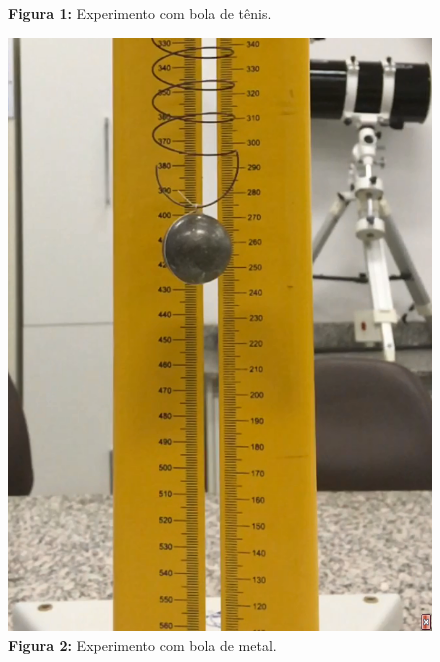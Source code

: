 \documentclass[a4paper, 12pt]{article}
\begin{document}
\begin{multicols}{2}
\begin{enumerate}
\begin{figure}[H]
				\captionsetup{labelformat=empty}
				\caption{\textbf{Figura 1:} Experimento com bola de tênis.}
			\end{figure}
			\begin{figure}[H]
				\centering
				\includegraphics[scale=0.3]{./img/bolaMetal.png}
				\captionsetup{labelformat=empty}
				\caption{\textbf{Figura 2:} Experimento com bola de metal.}
			\end{figure}
			

\end{enumerate}
\end{multicols}
\end{document}
